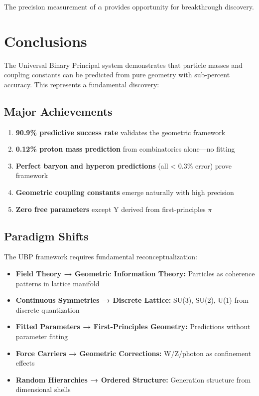 \documentclass[11pt,twocolumn]{article}
\begin{document}
The precision measurement of $\alpha$ provides opportunity for breakthrough discovery.

\section{Conclusions}

The Universal Binary Principal system demonstrates that particle masses and coupling constants can be predicted from pure geometry with sub-percent accuracy. This represents a fundamental discovery:

\subsection{Major Achievements}

\begin{enumerate}
\item \textbf{90.9\% predictive success rate} validates the geometric framework
\item \textbf{0.12\% proton mass prediction} from combinatorics alone—no fitting
\item \textbf{Perfect baryon and hyperon predictions} (all < 0.3\% error) prove framework
\item \textbf{Geometric coupling constants} emerge naturally with high precision
\item \textbf{Zero free parameters} except Y derived from first-principles $\pi$
\end{enumerate}

\subsection{Paradigm Shifts}

The UBP framework requires fundamental reconceptualization:

\begin{itemize}
\item \textbf{Field Theory → Geometric Information Theory:} Particles as coherence patterns in lattice manifold
\item \textbf{Continuous Symmetries → Discrete Lattice:} SU(3), SU(2), U(1) from discrete quantization
\item \textbf{Fitted Parameters → First-Principles Geometry:} Predictions without parameter fitting
\item \textbf{Force Carriers → Geometric Corrections:} W/Z/photon as confinement effects
\item \textbf{Random Hierarchies → Ordered Structure:} Generation structure from dimensional shells
\end{itemize}
\end{document}
